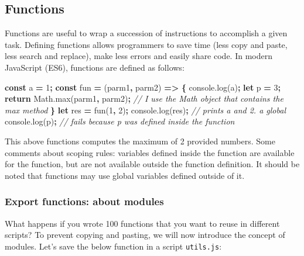 \documentclass[
]{book}
\newenvironment{Shaded}{\begin{snugshade}}{\end{snugshade}}
\newcommand{\AttributeTok}[1]{\textcolor[rgb]{0.77,0.63,0.00}{#1}}
\newcommand{\CommentTok}[1]{\textcolor[rgb]{0.56,0.35,0.01}{\textit{#1}}}
\newcommand{\ControlFlowTok}[1]{\textcolor[rgb]{0.13,0.29,0.53}{\textbf{#1}}}
\newcommand{\DecValTok}[1]{\textcolor[rgb]{0.00,0.00,0.81}{#1}}
\newcommand{\KeywordTok}[1]{\textcolor[rgb]{0.13,0.29,0.53}{\textbf{#1}}}
\newcommand{\NormalTok}[1]{#1}
\newcommand{\OperatorTok}[1]{\textcolor[rgb]{0.81,0.36,0.00}{\textbf{#1}}}
\newcommand{\VariableTok}[1]{\textcolor[rgb]{0.00,0.00,0.00}{#1}}
\begin{document}
\hypertarget{functions}{%
\subsection{Functions}\label{functions}}

Functions are useful to wrap a succession of instructions to accomplish a given task. Defining functions allows programmers to save time (less copy and paste, less search and replace), make less errors and easily share code. In modern JavaScript (ES6), functions are defined as follows:

\begin{Shaded}
\begin{Highlighting}[]
\KeywordTok{const}\NormalTok{ a }\OperatorTok{=} \DecValTok{1}\OperatorTok{;}
\KeywordTok{const}\NormalTok{ fun }\OperatorTok{=}\NormalTok{ (parm1}\OperatorTok{,}\NormalTok{ parm2) }\KeywordTok{=>} \OperatorTok{\{}
  \VariableTok{console}\NormalTok{.}\AttributeTok{log}\NormalTok{(a)}\OperatorTok{;}
  \KeywordTok{let}\NormalTok{ p }\OperatorTok{=} \DecValTok{3}\OperatorTok{;}
  \ControlFlowTok{return} \VariableTok{Math}\NormalTok{.}\AttributeTok{max}\NormalTok{(parm1}\OperatorTok{,}\NormalTok{ parm2)}\OperatorTok{;} \CommentTok{// I use the Math object that contains the max method}
\OperatorTok{\}}
\KeywordTok{let}\NormalTok{ res }\OperatorTok{=} \AttributeTok{fun}\NormalTok{(}\DecValTok{1}\OperatorTok{,} \DecValTok{2}\NormalTok{)}\OperatorTok{;}
\VariableTok{console}\NormalTok{.}\AttributeTok{log}\NormalTok{(res)}\OperatorTok{;} \CommentTok{// prints a and 2. a global}
\VariableTok{console}\NormalTok{.}\AttributeTok{log}\NormalTok{(p)}\OperatorTok{;} \CommentTok{// fails because p was defined inside the function}
\end{Highlighting}
\end{Shaded}

This above functions computes the maximum of 2 provided numbers. Some comments about scoping rules: variables defined inside the function are available for the function, but are not available outside the function definition. It should be noted that functions may use global variables defined outside of it.

\hypertarget{export-functions-about-modules}{%
\subsubsection{Export functions: about modules}\label{export-functions-about-modules}}

What happens if you wrote 100 functions that you want to reuse in different scripts? To prevent copying and pasting, we will now introduce the concept of modules. Let's save the below function in a script \texttt{utils.js}:
\end{document}
